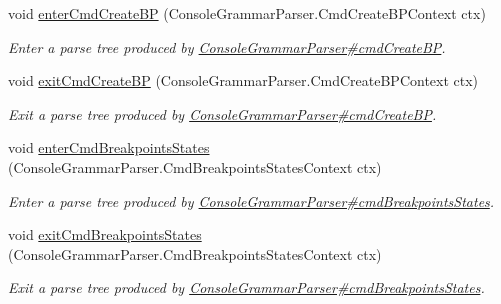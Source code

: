 \begin{DoxyCompactItemize}
void \hyperlink{interfacegov_1_1nasa_1_1jpf_1_1inspector_1_1client_1_1parser_1_1_console_grammar_listener_a9fa958ab2b7c45aa97a5c2e0f8293ec9}{enter\+Cmd\+Create\+BP} (Console\+Grammar\+Parser.\+Cmd\+Create\+B\+P\+Context ctx)
\begin{DoxyCompactList}\small\item\em Enter a parse tree produced by \hyperlink{classgov_1_1nasa_1_1jpf_1_1inspector_1_1client_1_1parser_1_1_console_grammar_parser_abe17248e2be8d9035749fc570f460e1b}{Console\+Grammar\+Parser\#cmd\+Create\+BP}. \end{DoxyCompactList}\item 
void \hyperlink{interfacegov_1_1nasa_1_1jpf_1_1inspector_1_1client_1_1parser_1_1_console_grammar_listener_a653dff81226fa3201c9d4f55434fe731}{exit\+Cmd\+Create\+BP} (Console\+Grammar\+Parser.\+Cmd\+Create\+B\+P\+Context ctx)
\begin{DoxyCompactList}\small\item\em Exit a parse tree produced by \hyperlink{classgov_1_1nasa_1_1jpf_1_1inspector_1_1client_1_1parser_1_1_console_grammar_parser_abe17248e2be8d9035749fc570f460e1b}{Console\+Grammar\+Parser\#cmd\+Create\+BP}. \end{DoxyCompactList}\item 
void \hyperlink{interfacegov_1_1nasa_1_1jpf_1_1inspector_1_1client_1_1parser_1_1_console_grammar_listener_a5c2335aeb7439699caa1367f370a809e}{enter\+Cmd\+Breakpoints\+States} (Console\+Grammar\+Parser.\+Cmd\+Breakpoints\+States\+Context ctx)
\begin{DoxyCompactList}\small\item\em Enter a parse tree produced by \hyperlink{classgov_1_1nasa_1_1jpf_1_1inspector_1_1client_1_1parser_1_1_console_grammar_parser_abd27b1db1328d8dcd4f5b25cd4db0407}{Console\+Grammar\+Parser\#cmd\+Breakpoints\+States}. \end{DoxyCompactList}\item 
void \hyperlink{interfacegov_1_1nasa_1_1jpf_1_1inspector_1_1client_1_1parser_1_1_console_grammar_listener_a2cc8fde3008463a179f01530c468a81c}{exit\+Cmd\+Breakpoints\+States} (Console\+Grammar\+Parser.\+Cmd\+Breakpoints\+States\+Context ctx)
\begin{DoxyCompactList}\small\item\em Exit a parse tree produced by \hyperlink{classgov_1_1nasa_1_1jpf_1_1inspector_1_1client_1_1parser_1_1_console_grammar_parser_abd27b1db1328d8dcd4f5b25cd4db0407}{Console\+Grammar\+Parser\#cmd\+Breakpoints\+States}. \end{DoxyCompactList}\item 

\end{DoxyCompactItemize}
